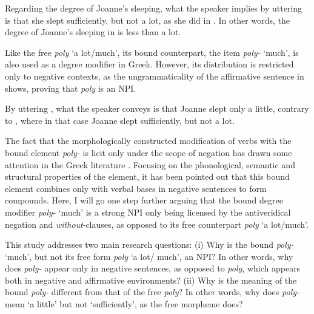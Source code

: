 \documentclass[output=paper]{langscibook}
\begin{document}
\noindent Regarding the degree of Joanne’s sleeping, what the speaker implies by uttering  is that she slept  sufficiently, but not a lot, as she did in . In other words, the degree of Joanne’s sleeping in  is less than a lot.

Like the free \textit{poly} ‘a lot/much’, its bound counterpart, the item \textit{poly-} ‘much’, is also used as a degree modifier in Greek. However, its distribution is restricted only to negative contexts, as the ungrammaticality of the affirmative sentence in  shows, proving that \textit{poly} is an NPI.

\begin{exe}
\ex\label{gia:ex3} \begin{xlist}
        \label{gia:ex3a}
        \label{gia:ex3b}
    \end{xlist}
\end{exe}

\noindent By uttering , what the speaker conveys is that Joanne slept only a little, contrary to , where in that case Joanne slept sufficiently, but not a lot.

The fact that the morphologically constructed modification of verbs with the bound element \textit{poly-} is licit only under the scope of negation has drawn some attention in the Greek literature \citep{delvevass1999,efthimiougavriili2003,ralli2004,dimelameli2009}. Focusing on the phonological, semantic and structural properties of the element, it has been pointed out that this bound element combines only with verbal bases in negative sentences to form compounds. Here, I will go one step further arguing that the bound degree modifier \textit{poly-} `much' is a strong NPI only being licensed by the antiveridical negation and \textit{without}-clauses, as opposed to its free counterpart \textit{poly} `a lot/much'.

This study addresses two main research questions: (i) Why is the bound \textit{poly-} ‘much’, but not its free form \textit{poly} ‘a lot/ much’, an NPI? In other words, why does \textit{poly-} appear only in negative sentences, as opposed to \textit{poly}, which appears both in negative and affirmative environments? (ii) Why is the meaning of the bound \textit{poly-} different from that of the free \textit{poly}? In other words, why does \textit{poly-} mean ‘a little’ but not ‘sufficiently’, as the free morpheme does?
\end{document}
